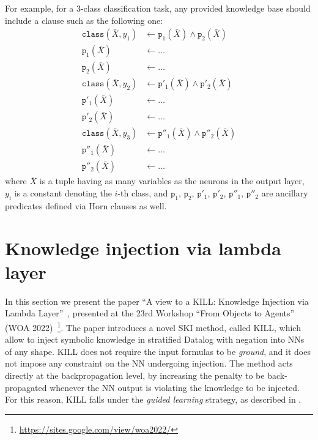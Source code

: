 For example, for a 3-class classification task, any provided knowledge base should include a clause such as the following one:
%
\begin{align*}
    \texttt{class}(\bar{X}, y_1) &\leftarrow \texttt{p}_1(\bar{X}) \land \texttt{p}_2(\bar{X}) \\
    \texttt{p}_1(\bar{X}) &\leftarrow \dots \\
    \texttt{p}_2(\bar{X}) &\leftarrow \dots \\
    \texttt{class}(\bar{X}, y_2) &\leftarrow \texttt{p}'_1(\bar{X}) \land \texttt{p}'_2(\bar{X}) \\
    \texttt{p}'_1(\bar{X}) &\leftarrow \dots \\
    \texttt{p}'_2(\bar{X}) &\leftarrow \dots \\
    \texttt{class}(\bar{X}, y_3) &\leftarrow \texttt{p}''_1(\bar{X}) \land \texttt{p}''_2(\bar{X}) \\
    \texttt{p}''_1(\bar{X}) &\leftarrow \dots \\
    \texttt{p}''_2(\bar{X}) &\leftarrow \dots
\end{align*}
%
where \(\bar{X}\) is a tuple having as many variables as the neurons in the output layer, \(y_i\) is a constant denoting the \(i\)-th class, and \(\texttt{p}_1\), \(\texttt{p}_2\), \(\texttt{p}'_1\), \(\texttt{p}'_2\), \(\texttt{p}''_1\), \(\texttt{p}''_2\) are ancillary predicates defined via Horn clauses as well.


\section{Knowledge injection via lambda layer}\label{sec:ski-contribution-kill}
%
In this section we present the paper ``A view to a KILL: Knowledge Injection via Lambda Layer''~\cite{DBLP:conf/woa/MagniniCO22}, presented at the 23rd Workshop ``From Objects to Agents'' (WOA 2022)~\footnote{\url{https://sites.google.com/view/woa2022/}}.
%
The paper introduces a novel \gls{SKI} method, called \gls{KILL}, which allow to inject symbolic knowledge in stratified Datalog with negation into \glspl{NN} of any shape.
%
\Gls{KILL} does not require the input formulas to be \emph{ground}, and it does not impose any constraint on the \gls{NN} undergoing injection.
%
The method acts directly at the backpropagation level, by increasing the penalty to be back-propagated whenever the \gls{NN} output is violating the knowledge to be injected.
%
For this reason, \gls{KILL} falls under the \emph{guided learning} strategy, as described in .


